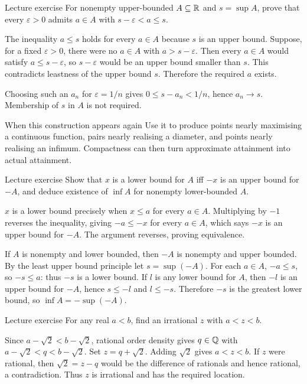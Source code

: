\begin{exam}{Lecture exercise}
For nonempty upper-bounded $A\subseteq\mathbb R$ and $s=\sup A$, prove that every $\varepsilon>0$ admits $a\in A$ with $s-\varepsilon<a\le s$.
\end{exam}
\begin{answer}
The inequality $a\le s$ holds for every $a\in A$ because $s$ is an upper bound. Suppose, for a fixed $\varepsilon>0$, there were no $a\in A$ with $a>s-\varepsilon$. Then every $a\in A$ would satisfy $a\le s-\varepsilon$, so $s-\varepsilon$ would be an upper bound smaller than $s$. This contradicts leastness of the upper bound $s$. Therefore the required $a$ exists.

Choosing such an $a_n$ for $\varepsilon=1/n$ gives $0\le s-a_n<1/n$, hence $a_n\to s$. Membership of $s$ in $A$ is not required.
\end{answer}
\begin{note}{When this construction appears again}
Use it to produce points nearly maximising a continuous function, pairs nearly realising a diameter, and points nearly realising an infimum. Compactness can then turn approximate attainment into actual attainment.
\end{note}
\begin{exam}{Lecture exercise}
Show that $x$ is a lower bound for $A$ iff $-x$ is an upper bound for $-A$, and deduce existence of $\inf A$ for nonempty lower-bounded $A$.
\end{exam}
\begin{answer}
$x$ is a lower bound precisely when $x\le a$ for every $a\in A$. Multiplying by $-1$ reverses the inequality, giving $-a\le-x$ for every $a\in A$, which says $-x$ is an upper bound for $-A$. The argument reverses, proving equivalence.

If $A$ is nonempty and lower bounded, then $-A$ is nonempty and upper bounded. By the least upper bound principle let $s=\sup(-A)$. For each $a\in A$, $-a\le s$, so $-s\le a$: thus $-s$ is a lower bound. If $l$ is any lower bound for $A$, then $-l$ is an upper bound for $-A$, hence $s\le-l$ and $l\le-s$. Therefore $-s$ is the greatest lower bound, so $\inf A=-\sup(-A)$.
\end{answer}
\begin{exam}{Lecture exercise}
For any real $a<b$, find an irrational $z$ with $a<z<b$.
\end{exam}
\begin{answer}
Since $a-\sqrt2<b-\sqrt2$, rational order density gives $q\in\mathbb Q$ with $a-\sqrt2<q<b-\sqrt2$. Set $z=q+\sqrt2$. Adding $\sqrt2$ gives $a<z<b$. If $z$ were rational, then $\sqrt2=z-q$ would be the difference of rationals and hence rational, a contradiction. Thus $z$ is irrational and has the required location.
\end{answer}
